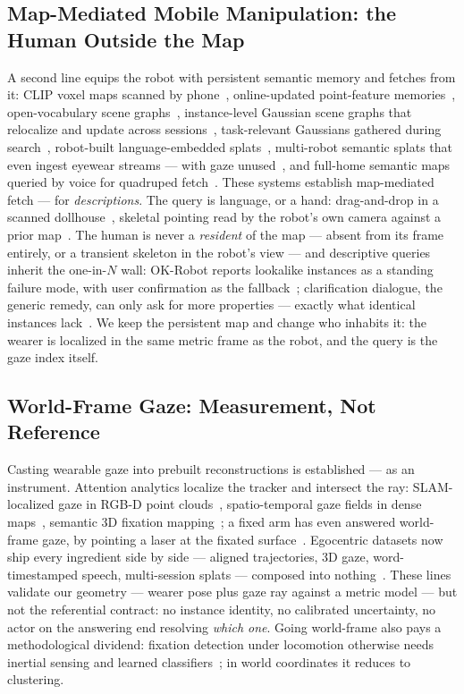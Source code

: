 \documentclass[letterpaper, 10 pt, conference]{ieeeconf}  %
\begin{document}
\subsection{Map-Mediated Mobile Manipulation: the Human Outside the Map}
A second line equips the robot with persistent semantic memory and
fetches from it: CLIP voxel maps scanned by phone~\cite{okrobot2024},
online-updated point-feature memories~\cite{dynamem2024},
open-vocabulary scene graphs~\cite{dovsg}, instance-level Gaussian
scene graphs that relocalize and update across
sessions~\cite{dgsgmind}, task-relevant Gaussians gathered during
search~\cite{helios}, robot-built language-embedded
splats~\cite{legs}, multi-robot semantic splats that even ingest
eyewear streams --- with gaze unused~\cite{hammer}, and full-home
semantic maps queried by voice for quadruped
fetch~\cite{beyondcybathlon}. These systems establish map-mediated
fetch --- for \emph{descriptions}. The query is language, or a hand:
drag-and-drop in a scanned dollhouse~\cite{holospot}, skeletal
pointing read by the robot's own camera against a prior
map~\cite{miel}. The human is never a \emph{resident} of the map ---
absent from its frame entirely, or a transient skeleton in the
robot's view --- and descriptive queries inherit the one-in-$N$ wall:
OK-Robot reports lookalike instances as a standing failure mode, with
user confirmation as the fallback~\cite{okrobot2024}; clarification
dialogue, the generic remedy, can only ask for more properties ---
exactly what identical instances lack~\cite{ingress2020,hatori2018}.
We keep the persistent map and change who inhabits it: the wearer is
localized in the same metric frame as the robot, and the query is the
gaze index itself.

\subsection{World-Frame Gaze: Measurement, Not Reference}
Casting wearable gaze into prebuilt reconstructions is established
--- as an instrument. Attention analytics localize the tracker and
intersect the ray: SLAM-localized gaze in RGB-D point
clouds~\cite{wang2018}, spatio-temporal gaze fields in dense
maps~\cite{attention4d}, semantic 3D fixation
mapping~\cite{semanticfovea}; a fixed arm has even answered
world-frame gaze, by pointing a laser at the fixated
surface~\cite{kogkas2017}. Egocentric datasets now ship every
ingredient side by side --- aligned trajectories, 3D gaze,
word-timestamped speech, multi-session splats --- composed into
nothing~\cite{aea2024}. These lines validate our geometry --- wearer
pose plus gaze ray against a metric model --- but not the referential
contract: no instance identity, no calibrated uncertainty, no actor
on the answering end resolving \emph{which one}. Going world-frame
also pays a methodological dividend: fixation detection under
locomotion otherwise needs inertial sensing and learned
classifiers~\cite{kothari2020}; in world coordinates it reduces to
clustering.
\end{document}
